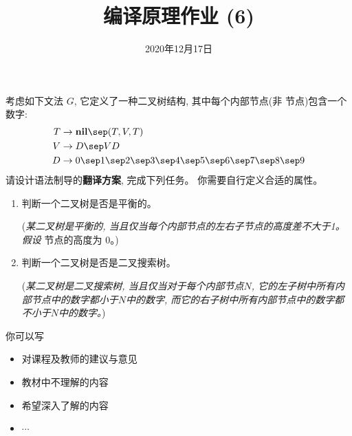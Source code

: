 \documentclass[a4paper, justified]{tufte-handout}
\title{编译原理作业 (6)}
\date{2020年12月17日}
\begin{document}
\maketitle
\noplagiarism %
\begin{abstract}
\end{abstract}
\beginrequired

\begin{problem}[\score{20 = 10 + 10}]
  考虑如下文法 $G$, 它定义了一种二叉树结构, 其中每个内部节点(非  节点)包含一个数字:
  \begin{align*}
    T &\to \text{\bf nil} \sep (T, V, T) \\
    V &\to D \sep V D \\
    D &\to 0 \sep 1 \sep 2 \sep 3 \sep 4 \sep 5 \sep 6 \sep 7 \sep 8 \sep 9
  \end{align*}
  请设计语法制导的{\bf 翻译方案}, 完成下列任务。
  你需要自行定义合适的属性。
  \begin{enumerate}[(1)]
    \item 判断一个二叉树是否是平衡的。

    ({\it 某二叉树是平衡的, 当且仅当每个内部节点的左右子节点的高度差不大于1。
        假设 } 节点的高度为 0。)
    \item 判断一个二叉树是否是二叉搜索树。

    ({\it 某二叉树是二叉搜索树, 当且仅当对于每个内部节点$N$,
        它的左子树中所有内部节点中的数字都小于$N$中的数字,
        而它的右子树中所有内部节点中的数字都不小于$N$中的数字。})
  \end{enumerate}
\end{problem}

\begin{solution}
\end{solution}



\beginfb

你可以写
\begin{itemize}
  \item 对课程及教师的建议与意见
  \item 教材中不理解的内容
  \item 希望深入了解的内容
  \item $\cdots$
\end{itemize}
\end{document}
